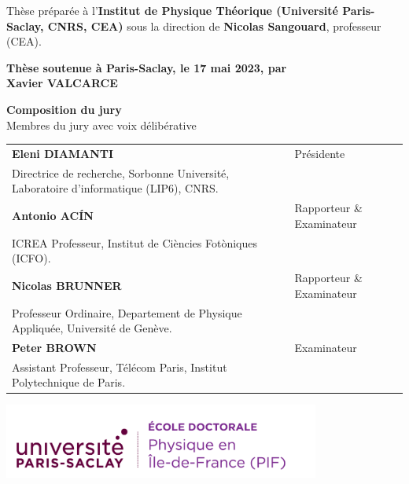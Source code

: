 \documentclass[french,12pt,a4paper]{book}
\begin{document}
\begin{titlepage}
		\footnotesize Thèse préparée à l’\textbf{Institut de Physique Théorique (Université Paris-Saclay, CNRS, CEA)} sous la direction de \textbf{Nicolas Sangouard}, professeur (CEA). \\
		\vspace{15mm}
		
		\textbf{Thèse soutenue à Paris-Saclay, le 17 mai 2023, par}\\
		\bigskip
		\Large {\color{Prune} \textbf{Xavier VALCARCE}}
		
		\vspace{\fill} %
		
		\bigskip
		
		\flushleft
		\small \textbf{Composition du jury}\\
		\vspace{2mm}
		\small Membres du jury avec voix délibérative \\
		\vspace{2mm}
		\scriptsize
		\begin{tabular}{|p{7cm}l}
			\arrayrulecolor{Prune}
			\textbf{Eleni DIAMANTI} & Présidente\\ 
			Directrice de recherche, Sorbonne Université, Laboratoire d'informatique (LIP6), CNRS. & \\
			\textbf{Antonio AC\'IN} &  Rapporteur \& Examinateur \\ 
			ICREA Professeur, Institut de Ciències Fotòniques (ICFO).   &   \\ 
			\textbf{Nicolas BRUNNER} &  Rapporteur \& Examinateur \\ 
			Professeur Ordinaire, Departement de Physique Appliquée, Université de Genève.  &   \\ 
			\textbf{Peter BROWN} &  Examinateur \\ 
			Assistant Professeur, Télécom Paris, Institut Polytechnique de Paris.   &  
		\end{tabular} 
		
	\end{titlepage}

\Ifthispageodd{\newpage\thispagestyle{empty}\null\newpage}{}
\thispagestyle{empty}
\selectfont

\lhead{}
\rhead{}
\rfoot{}
\cfoot{}
\lfoot{}

\noindent 
\includegraphics[height=2.45cm]{Logo/logo_usp_PIF.png}
\vspace{.5cm}
\selectfont
\end{document}
